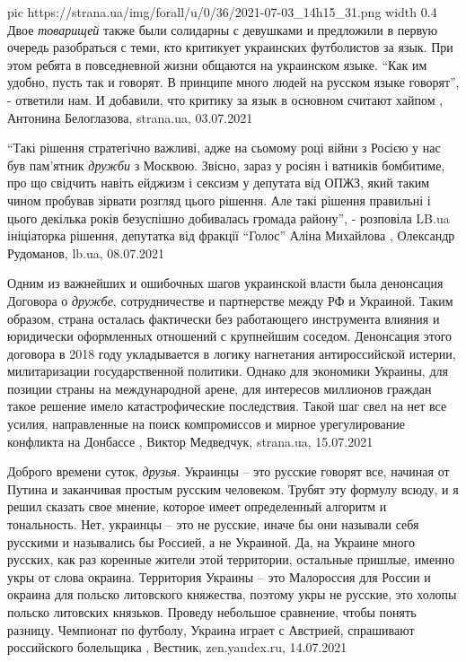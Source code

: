 \ifcmt
  pic https://strana.ua/img/forall/u/0/36/2021-07-03_14h15_31.png
	width 0.4
\fi
Двое \emph{товарищей} также были солидарны с девушками и предложили в первую очередь
разобраться с теми, кто критикует украинских футболистов за язык.  При этом
ребята в повседневной жизни общаются на украинском языке.  \enquote{Как им удобно,
пусть так и говорят. В принципе много людей на русском языке говорят}, -
ответили нам. И добавили, что критику за язык в основном считают хайпом
, 
Антонина Белоглазова, strana.ua, 03.07.2021

\enquote{Такі рішення стратегічно важливі, адже на сьомому році війни з Росією у нас
був пам'ятник \emph{дружби} з Москвою. Звісно, зараз у росіян і ватників бомбитиме,
про що свідчить навіть ейджизм і сексизм у депутата від ОПЖЗ, який таким чином
пробував зірвати розгляд цього рішення. Але такі рішення правильні і цього
декілька років безуспішно добивалась громада району}, - розповіла LB.ua
ініціаторка рішення, депутатка від фракції \enquote{Голос} Аліна Михайлова
, 
Олександр Рудоманов, lb.ua, 08.07.2021

Одним из важнейших и ошибочных шагов украинской власти была денонсация Договора
о \emph{дружбе}, сотрудничестве и партнерстве между РФ и Украиной. Таким
образом, страна осталась фактически без работающего инструмента влияния и
юридически оформленных отношений с крупнейшим соседом.  Денонсация этого
договора в 2018 году укладывается в логику нагнетания антироссийской истерии,
милитаризации государственной политики. Однако для экономики Украины, для
позиции страны на международной арене, для интересов миллионов граждан такое
решение имело катастрофические последствия. Такой шаг свел на нет все усилия,
направленные на поиск компромиссов и мирное урегулирование конфликта на
Донбассе
, 
Виктор Медведчук, strana.ua, 15.07.2021

Доброго времени суток, \emph{друзья}. Украинцы – это русские говорят все,
начиная от Путина и заканчивая простым русским человеком. Трубят эту формулу
всюду, и я решил сказать свое мнение, которое имеет определенный алгоритм и
тональность.  Нет, украинцы – это не русские, иначе бы они называли себя
русскими и назывались бы Россией, а не Украиной. Да, на Украине много русских,
как раз коренные жители этой территории, остальные пришлые, именно укры от
слова окраина. Территория Украины – это Малороссия для России и окраина для
польско литовского княжества, поэтому укры не русские, это холопы польско
литовских князьков.  Проведу небольшое сравнение, чтобы понять разницу.
Чемпионат по футболу, Украина играет с Австрией, спрашивают российского
болельщика
, Вестник, zen.yandex.ru, 14.07.2021

